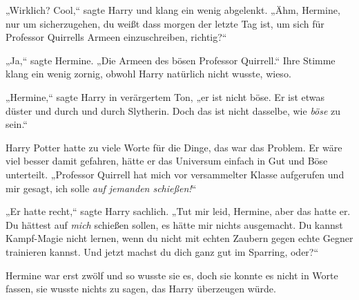 „Wirklich? Cool,“ sagte Harry und klang ein wenig abgelenkt. „Ähm, Hermine, nur um sicherzugehen, du weißt dass morgen der letzte Tag ist, um sich für Professor Quirrells Armeen einzuschreiben, richtig?“

„Ja,“ sagte Hermine. „Die Armeen des bösen Professor Quirrell.“ Ihre Stimme klang ein wenig zornig, obwohl Harry natürlich nicht wusste, wieso.

„Hermine,“ sagte Harry in verärgertem Ton, „er ist nicht böse. Er ist etwas düster und durch und durch Slytherin. Doch das ist nicht dasselbe, wie \emph{böse} zu sein.“

Harry Potter hatte zu viele Worte für die Dinge, das war das Problem. Er wäre viel besser damit gefahren, hätte er das Universum einfach in Gut und Böse unterteilt. „Professor Quirrell hat mich vor versammelter Klasse aufgerufen und mir gesagt, ich solle \emph{auf jemanden schießen!}“

„Er hatte recht,“ sagte Harry sachlich. „Tut mir leid, Hermine, aber das hatte er. Du hättest auf \emph{mich} schießen sollen, es hätte mir nichts ausgemacht. Du kannst Kampf-Magie nicht lernen, wenn du nicht mit echten Zaubern gegen echte Gegner trainieren kannst. Und jetzt machst du dich ganz gut im Sparring, oder?“

Hermine war erst zwölf und so wusste sie es, doch sie konnte es nicht in Worte fassen, sie wusste nichts zu sagen, das Harry überzeugen würde.

